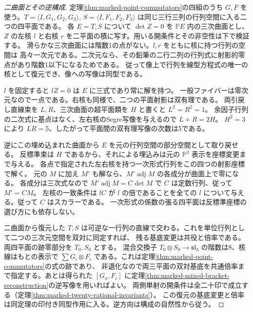 \begin{proof}[二曲面とその逆構成]
定理\ref{thm:marked-point-commutators}の四組のうち $G,F$ を使う。$T=\langle I,G_1,G_2,G_3\rangle$,
$S=\langle I,F_1,F_2,F_3\rangle$ は同じ三行三列の行列空間に入る二つの四平面である。
各 $E=T,S$ について $\det Z=0$ を $\mathbb P E$ 内の三次曲面とし、
$Z$ の左核 $l$ と右核 $r$ を二平面の積に写す。用いる開条件とその非空性は下で検証する。
滑らかな三次曲面には階数1の点がない。$l,r$ をともに核に持つ行列の空間は
高々一次元である。二次元なら、その鉛筆の二行二列の行列式に射影的零点があり階数1以下になるためである。
従って像上で行列を線型方程式の唯一の核として復元でき、像への写像は同型である。

$l$ を固定すると $lZ=0$ は $E$ に三式であり常に解を持つ。
一般ファイバーは零次元なので一点である。右核も同様で、二つの平面射影は双有理である。
両引戻し直線束を $L,R$、三次曲面の超平面類を $H$ と書くと $L^2=R^2=1$。
余因子行列の二次式に基点はなく、左右核のSegre写像を与えるので $L+R=2H$。
$H^2=3$ により $LR=5$、したがって平面間の双有理写像の次数は5である。

逆にこの埋め込まれた曲面から $E$ を元の行列空間の部分空間として取り戻せる。
反標準束は $H$ であるから、それによる埋込みは元の $\mathbb P^3$ 表示を座標変更まで与える。
各点で指定された左右核を持つ一次形式行列をこの四つの射影座標で解く。
元の $M$ に加え $M'$ も解なら、$M'\operatorname{adj}M$ の各成分が曲面上で零になる。
各成分は三次式なので $M'\operatorname{adj}M=C\det M$ で $C$ は定数行列、従って $M'=CM$。
左核の一致条件は $l C$ が $l$ の倍であることを全ての $l$ について与える。従って $C$ はスカラーである。
一次形式の係数の張る四平面は反標準座標の選び方にも依存しない。

二曲面から復元した $T,S$ は可逆な一行列の直線で交わる。これを単位行列として二つの三次元空間を双対に同定すれば、
残る基底変更は共役と倍率である。両四平面の跡零部分を $T_0,S_0$ とする。
混合交換子 $T_0\otimes S_0\to\mathfrak{sl}_3$ の階数は8、核線はもとの表示で
$\sum G_i\otimes F_i$ である。これは定理\ref{thm:marked-point-commutators}の式の跡であり、
非退化なので両三平面の双対基底を共通倍率まで指定する。あとは得られた
$[G_a,F_c]$ に定理\ref{thm:marked-mixed-bracket-reconstruction}の逆写像を用いればよい。
両側単射の開条件は全二十印で成立する（定理\ref{thm:marked-twenty-rational-invariants}）。
この復元の基底変更と倍率は同定理の印付き同型作用に入る。逆方向は構成の自然性から従う。
\end{proof}

